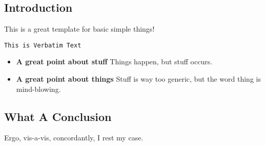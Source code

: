 \documentclass[12pt,a4paper]{article}
\begin{document}
\subsection*{Introduction}

This is a great template for basic simple things!

\begin{verbatim}
This is Verbatim Text
\end{verbatim}

\begin{itemize}

\item \textbf{A great point about stuff} Things happen, but stuff occurs.

\item \textbf{A great point about things} Stuff is way too generic, but the word thing is mind-blowing.

\end{itemize}

\subsection*{What A Conclusion}

Ergo, vis-a-vis, concordantly, I rest my case. 
\end{document}
